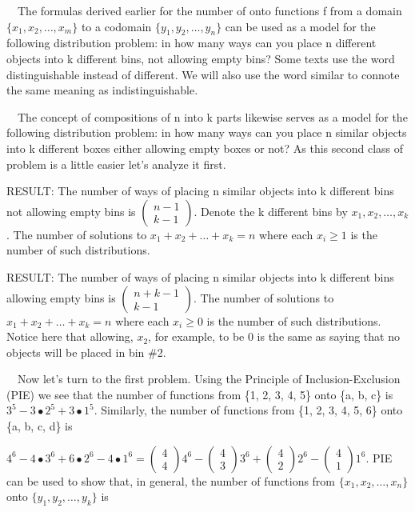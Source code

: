 \documentclass{article}
\begin{document}
\ \ The formulas derived earlier for the number of onto functions f from a domain  $\{x_1,x_2,{\dots},x_m\}$ to a
codomain  $\{y_1,y_2,{\dots},y_n\}$ can be used as a model for the following distribution problem: in how many ways can
you place n different objects into k different bins, not allowing empty bins? Some texts use the word distinguishable
instead of different. We will also use the word similar to connote the same meaning as indistinguishable. 

\ \ The concept of compositions of n into k parts likewise serves as a model for the following distribution problem: in
how many ways can you place n similar objects into k different boxes either allowing empty boxes or not? As this second
class of problem is a little easier let’s analyze it first. 

RESULT: The number of ways of placing n similar objects into k different bins not allowing empty bins is 
$\left(\begin{matrix}n-1\\k-1\end{matrix}\right)$. Denote the k different bins by  $x_1,x_2,{\dots},x_k$. The number of
solutions to  $x_1+x_2+{\dots}+x_k=n$ where each  $x_i{\geq}1$ is the number of such distributions. 

RESULT: The number of ways of placing n similar objects into k different bins allowing empty bins is 
$\left(\begin{matrix}n+k-1\\k-1\end{matrix}\right)$. The number of solutions to  $x_1+x_2+{\dots}+x_k=n$ where each 
$x_i{\geq}0$ is the number of such distributions. Notice here that allowing,  $x_2$, for example, to be 0 is the same
as saying that no objects will be placed in bin \#2. 

\ \ Now let’s turn to the first problem. Using the Principle of Inclusion-Exclusion (PIE) we see that the number of
functions from \{1, 2, 3, 4, 5\} onto \{a, b, c\} is  $3^5-3{\bullet}2^5+3{\bullet}1^5$. Similarly, the number of
functions from \{1, 2, 3, 4, 5, 6\} onto \{a, b, c, d\} is

 
$4^6-4{\bullet}3^6+6{\bullet}2^6-4{\bullet}1^6=\left(\begin{matrix}4\\4\end{matrix}\right)4^6-\left(\begin{matrix}4\\3\end{matrix}\right)3^6+\left(\begin{matrix}4\\2\end{matrix}\right)2^6-\left(\begin{matrix}4\\1\end{matrix}\right)1^6.$
PIE can be used to show that, in general, the number of functions from  $\{x_1,x_2,{\dots},x_n\}$ onto 
$\{y_1,y_2,{\dots},y_k\}$ is
\end{document}

